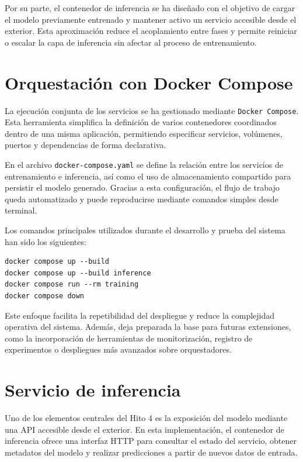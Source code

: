 Por su parte, el contenedor de inferencia se ha dise\~nado con el objetivo de cargar el modelo previamente entrenado y mantener activo un
servicio accesible desde el exterior. Esta aproximaci\'on reduce el acoplamiento entre fases y permite reiniciar o escalar la capa de
inferencia sin afectar al proceso de entrenamiento.

\section{Orquestaci\'on con Docker Compose}

La ejecuci\'on conjunta de los servicios se ha gestionado mediante \texttt{Docker Compose}. Esta herramienta simplifica la definici\'on de
varios contenedores coordinados dentro de una misma aplicaci\'on, permitiendo especificar servicios, vol\'umenes, puertos y dependencias de
forma declarativa.

En el archivo \texttt{docker-compose.yaml} se define la relaci\'on entre los servicios de entrenamiento e inferencia, as\'i como el uso de
almacenamiento compartido para persistir el modelo generado. Gracias a esta configuraci\'on, el flujo de trabajo queda automatizado y puede
reproducirse mediante comandos simples desde terminal.

Los comandos principales utilizados durante el desarrollo y prueba del sistema han sido los siguientes:

\begin{verbatim}
docker compose up --build
docker compose up --build inference
docker compose run --rm training
docker compose down
\end{verbatim}

Este enfoque facilita la repetibilidad del despliegue y reduce la complejidad operativa del sistema. Adem\'as, deja preparada la base para
futuras extensiones, como la incorporaci\'on de herramientas de monitorizaci\'on, registro de experimentos o despliegues m\'as avanzados
sobre orquestadores.

\section{Servicio de inferencia}

Uno de los elementos centrales del Hito 4 es la exposici\'on del modelo mediante una API accesible desde el exterior. En esta implementaci\'on,
el contenedor de inferencia ofrece una interfaz HTTP para consultar el estado del servicio, obtener metadatos del modelo y realizar
predicciones a partir de nuevos datos de entrada.

